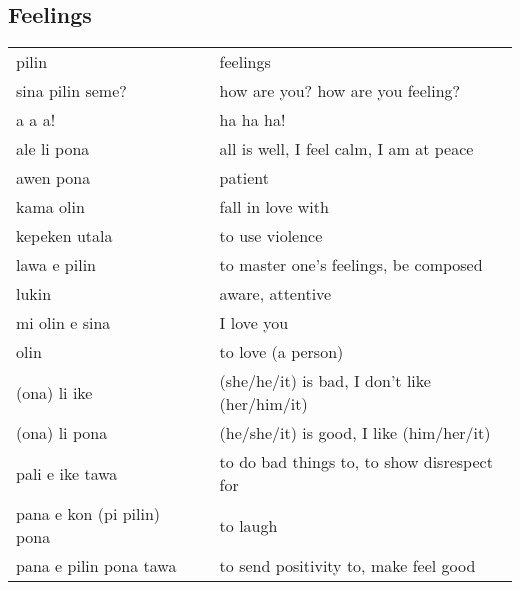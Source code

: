 \subsection{Feelings}

\begin{supertabular}{p{4,5cm}|ll}
    pilin                       &  & feelings                                                           \\
    sina pilin seme?            &  & how are you? how are you feeling?                                  \\
    a a a!                      &  & ha ha ha!                                                          \\
    ale li pona                 &  & all is well, I feel calm, I am at peace                            \\
    awen pona                   &  & patient                                                            \\
    kama olin                   &  & fall in love with                                                  \\
    kepeken utala               &  & to use violence                                                    \\
    lawa e pilin                &  & to master one's feelings, be composed                              \\
    lukin                       &  & aware, attentive                                                   \\
    mi olin e sina              &  & I love you                                                         \\
    olin                        &  & to love (a person)                                                 \\
    (ona) li ike                &  & (she/he/it) is bad, I don't like (her/him/it)                      \\
    (ona) li pona               &  & (he/she/it) is good, I like (him/her/it)                           \\
    pali e ike tawa             &  & to do bad things to, to show disrespect for                        \\
    pana e kon (pi pilin) pona  &  & to laugh                                                           \\
    pana e pilin pona tawa      &  & to send positivity to, make feel good                              \\

\end{supertabular}
